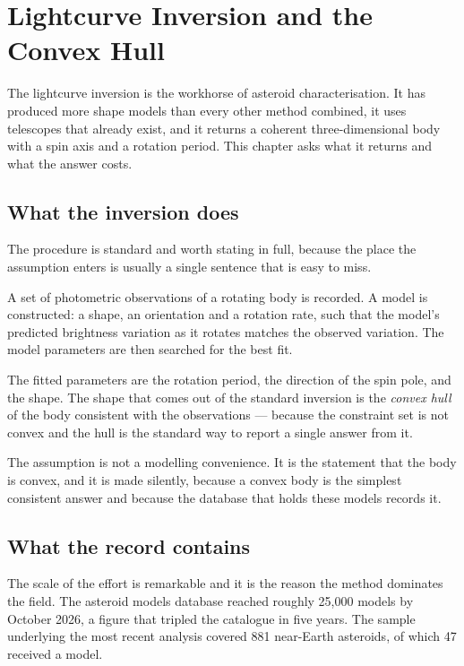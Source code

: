 
\chapter{Lightcurve Inversion and the Convex Hull}
\label{ch:lightcurve}

The lightcurve inversion is the workhorse of asteroid characterisation. It
has produced more shape models than every other method combined, it uses
telescopes that already exist, and it returns a coherent three-dimensional
body with a spin axis and a rotation period. This chapter asks what it
returns and what the answer costs.

\section{What the inversion does}

The procedure is standard and worth stating in full, because the place the
assumption enters is usually a single sentence that is easy to miss.

A set of photometric observations of a rotating body is recorded. A model is
constructed: a shape, an orientation and a rotation rate, such that the
model's predicted brightness variation as it rotates matches the observed
variation. The model parameters are then searched for the best fit.

The fitted parameters are the rotation period, the direction of the spin
pole, and the shape. The shape that comes out of the standard inversion is
the \emph{convex hull} of the body consistent with the observations ---
because the constraint set is not convex and the hull is the standard way to
report a single answer from it.

The assumption is not a modelling convenience. It is the statement that the
body is convex, and it is made silently, because a convex body is the
simplest consistent answer and because the database that holds these models
records it.

\section{What the record contains}

The scale of the effort is remarkable and it is the reason the method
dominates the field. The asteroid models database reached roughly 25,000
models by October 2026, a figure that tripled the catalogue in five years.
The sample underlying the most recent analysis covered 881 near-Earth
asteroids, of which 47 received a model.

